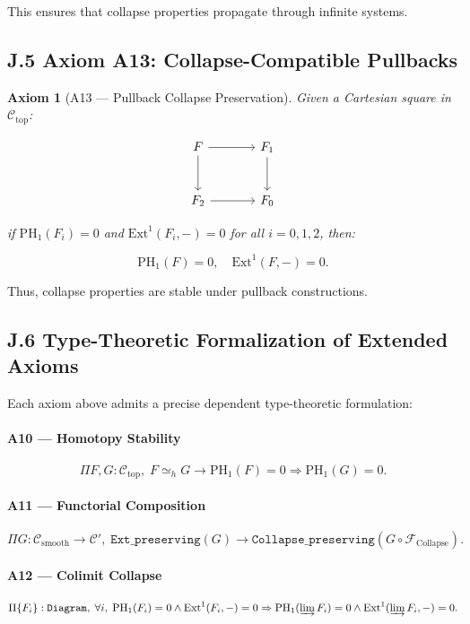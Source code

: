 \documentclass[11pt]{article}
\newtheorem{axiom}{Axiom}[section]
\begin{document}
This ensures that collapse properties propagate through infinite systems.

\subsection*{J.5 Axiom A13: Collapse-Compatible Pullbacks}

\begin{axiom}[A13 — Pullback Collapse Preservation]
Given a Cartesian square in \( \mathcal{C}_{\mathrm{top}} \):

\[
\begin{tikzcd}[row sep=large, column sep=large]
F \arrow[r] \arrow[d] & F_1 \arrow[d] \\
F_2 \arrow[r] & F_0
\end{tikzcd}
\]

if \( \mathrm{PH}_1(F_i) = 0 \) and \( \mathrm{Ext}^1(F_i, -) = 0 \) for all \( i = 0, 1, 2 \), then:

\[
\mathrm{PH}_1(F) = 0, \quad \mathrm{Ext}^1(F, -) = 0.
\]
\end{axiom}

Thus, collapse properties are stable under pullback constructions.

\subsection*{J.6 Type-Theoretic Formalization of Extended Axioms}

Each axiom above admits a precise dependent type-theoretic formulation:

\paragraph{A10 — Homotopy Stability}
\[
\Pi F, G : \mathcal{C}_{\mathrm{top}}, \; F \simeq_h G \to \mathrm{PH}_1(F) = 0 \Rightarrow \mathrm{PH}_1(G) = 0.
\]

\paragraph{A11 — Functorial Composition}
\[
\Pi G : \mathcal{C}_{\mathrm{smooth}} \to \mathcal{C}', \;
\texttt{Ext\_preserving}(G) \to \texttt{Collapse\_preserving}(G \circ \mathcal{F}_{\mathrm{Collapse}}).
\]

\paragraph{A12 — Colimit Collapse}
\[
\Pi \{ F_i \} : \texttt{Diagram}, \;
\forall i, \; \mathrm{PH}_1(F_i) = 0 \wedge \mathrm{Ext}^1(F_i, -) = 0 \Rightarrow \mathrm{PH}_1(\varinjlim F_i) = 0 \wedge \mathrm{Ext}^1(\varinjlim F_i, -) = 0.
\]
\end{document}
